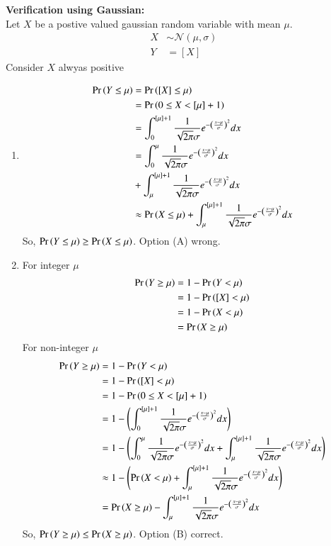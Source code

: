 \documentclass[journal,12pt,twocolumn]{IEEEtran}
\theoremstyle{remark}
\begin{document}
\textbf{Verification using Gaussian:}\\
Let $X$ be a postive valued gaussian random variable with mean $\mu$.
\begin{align}
X &\sim \mathcal{N}(\mu,\sigma)\\
Y&=[X]
\end{align}
Consider $X$ alwyas positive
\begin{enumerate}
\item
\begin{align}
\Pr\left(Y \leq \mu\right)&=\Pr\left([X] \leq \mu\right)\\
&=\Pr\left(0 \leq X < [\mu]+1\right)\\
&= \int_{0}^{[\mu]+1} \frac{1}{\sqrt{2\pi}\sigma} e^{-\left(\frac{x-\mu}{\sigma}\right)^2} dx\\
&=\int_{0}^{\mu}\frac{1}{\sqrt{2\pi}\sigma} e^{-\left(\frac{x-\mu}{\sigma}\right)^2} dx \notag\\
&         + \int_{\mu}^{[\mu]+1}\frac{1}{\sqrt{2\pi}\sigma} e^{-\left(\frac{x-\mu}{\sigma}\right)^2} dx \\
&\approx \Pr\left(X \leq \mu\right) +\int_{\mu}^{[\mu]+1}\frac{1}{\sqrt{2\pi}\sigma} e^{-\left(\frac{x-\mu}{\sigma}\right)^2} dx
\end{align}
So, $\Pr\left(Y \leq \mu\right) \geq \Pr\left(X \leq \mu\right)$. Option (A) wrong.
\item 
For integer $\mu$
\begin{align}
\Pr\left(Y \geq \mu\right)&=1-\Pr\left(Y < \mu\right)\\
&=1-\Pr\left([X]<\mu\right)\\
&=1-\Pr\left(X < \mu\right)\\
&=\Pr\left(X \geq \mu\right)
\end{align}
For non-integer $\mu$
\begin{align}
\Pr\left(Y \geq \mu\right)&=1-\Pr\left(Y < \mu\right)\\
&=1-\Pr\left([X]<\mu\right)\\
&=1-\Pr\left(0 \leq X < [\mu]+1\right)\\
&=1-\left(\int_{0}^{[\mu]+1} \frac{1}{\sqrt{2\pi}\sigma} e^{-\left(\frac{x-\mu}{\sigma}\right)^2} dx\right)\\
&=1-\left(\int_{0}^{\mu}\frac{1}{\sqrt{2\pi}\sigma} e^{-\left(\frac{x-\mu}{\sigma}\right)^2} dx  + \int_{\mu}^{[\mu]+1}\frac{1}{\sqrt{2\pi}\sigma} e^{-\left(\frac{x-\mu}{\sigma}\right)^2} dx\right)\\
&\approx 1-\left(\Pr\left(X < \mu\right) +\int_{\mu}^{[\mu]+1}\frac{1}{\sqrt{2\pi}\sigma} e^{-\left(\frac{x-\mu}{\sigma}\right)^2} dx\right)\\
&=\Pr\left(X \geq \mu\right)-\int_{\mu}^{[\mu]+1}\frac{1}{\sqrt{2\pi}\sigma} e^{-\left(\frac{x-\mu}{\sigma}\right)^2} dx
\end{align}
So, $\Pr\left(Y \geq \mu\right) \leq \Pr\left(X \geq \mu\right)$. Option (B) correct.
\end{enumerate}
\end{document}
